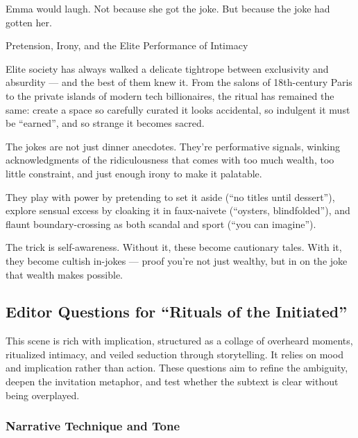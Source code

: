 Emma would laugh.
Not because she got the joke.
But because the joke had gotten her.

\medskip

\begin{HistoricalSidebar}{Pretension, Irony, and the Elite Performance of Intimacy}

  Elite society has always walked a delicate tightrope between exclusivity and absurdity — and the best 
  of them knew it. From the salons of 18th-century Paris to the private islands of modern tech 
  billionaires, the ritual has remained the same: create a space so carefully curated it looks 
  accidental, so indulgent it must be ``earned'', and so strange it becomes sacred.

  \medskip
  
  The jokes are not just dinner anecdotes. They’re performative signals, winking acknowledgments of the 
  ridiculousness that comes with too much wealth, too little constraint, and just enough irony to 
  make it palatable.

  \medskip
  
  They play with power by pretending to set it aside (“no titles until dessert”), explore sensual 
  excess by cloaking it in faux-naivete (“oysters, blindfolded”), and flaunt boundary-crossing as 
  both scandal and sport (“you can imagine”). 

  \medskip
  
  The trick is self-awareness. Without it, these become cautionary tales. With it, they become 
  cultish in-jokes — proof you’re not just wealthy, but in on the joke that wealth makes possible.
  
\end{HistoricalSidebar}


\subsection*{Editor Questions for ``Rituals of the Initiated''}

This scene is rich with implication, structured as a collage of overheard moments, ritualized intimacy, and veiled seduction through storytelling. It relies on mood and implication rather than action. These questions aim to refine the ambiguity, deepen the invitation metaphor, and test whether the subtext is clear without being overplayed.

\subsubsection*{Narrative Technique and Tone}

